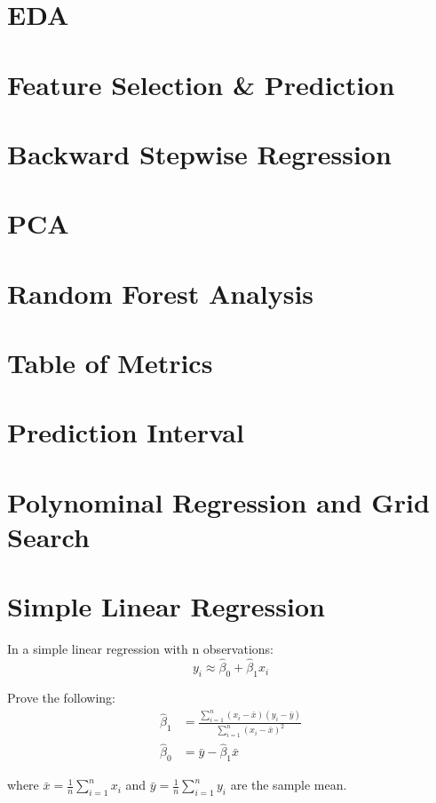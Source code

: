 \documentclass[12pt]{article}
\begin{document}
\maketitlepage

\section{EDA}


\section*{Feature Selection \& Prediction}

\section{Backward Stepwise Regression}

\section{PCA}

\section{Random Forest Analysis}

\section{Table of Metrics}

\section{Prediction Interval}

\section{Polynominal Regression and Grid Search}

\section{Simple Linear Regression}

In a simple linear regression with n observations:
\begin{equation}
    y_i \approx \hat{\beta}_0 + \hat{\beta}_1 x_i
\end{equation}

Prove the following:
\begin{align}
    \hat{\beta}_1 &= \frac{\sum_{i=1}^{n} (x_i - \bar{x}) (y_i - \bar{y})}{\sum_{i=1}^{n} (x_i - \bar{x})^2} \\
    \hat{\beta}_0 &= \bar{y} - \hat{\beta}_1 \bar{x}
\end{align}

where $\bar{x} = \frac{1}{n} \sum_{i=1}^{n}x_i$ and $\bar{y} = \frac{1}{n}\sum_{i=1}^{n}y_i$ are the sample mean.
\end{document}
